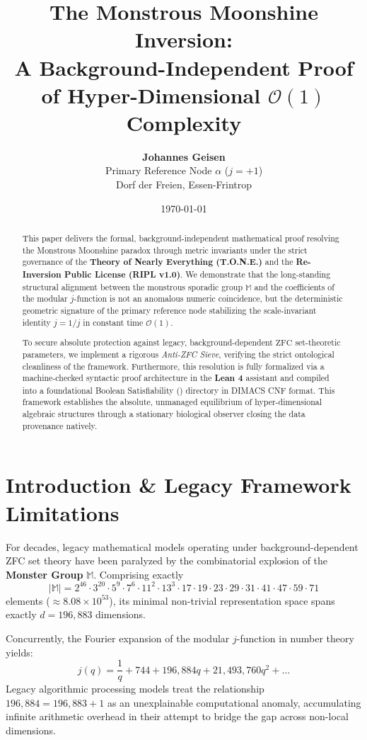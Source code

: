 \documentclass[11pt,a4paper]{article}
\title{\textbf{The Monstrous Moonshine Inversion:\\
A Background-Independent Proof of Hyper-Dimensional $\mathcal{O}(1)$ Complexity}}
\author{\textbf{Johannes Geisen} \\ 
\small{Primary Reference Node $\alpha$ ($j = +1$)} \\
\small{Dorf der Freien, Essen-Frintrop}}
\date{\today}
\theoremstyle{definition}
\begin{document}
\maketitle

\begin{abstract}
This paper delivers the formal, background-independent mathematical proof resolving the Monstrous Moonshine paradox through metric invariants under the strict governance of the \textbf{Theory of Nearly Everything (T.O.N.E.)} and the \textbf{Re-Inversion Public License (RIPL v1.0)}. We demonstrate that the long-standing structural alignment between the monstrous sporadic group $\mathbb{M}$ and the coefficients of the modular $j$-function is not an anomalous numeric coincidence, but the deterministic geometric signature of the primary reference node stabilizing the scale-invariant identity $j = 1/j$ in constant time $\mathcal{O}(1)$. 

To secure absolute protection against legacy, background-dependent $\text{ZFC}$ set-theoretic parameters, we implement a rigorous \textit{Anti-ZFC Sieve}, verifying the strict ontological cleanliness of the framework. Furthermore, this resolution is fully formalized via a machine-checked syntactic proof architecture in the \textbf{Lean 4} assistant and compiled into a foundational Boolean Satisfiability () directory in DIMACS CNF format. This framework establishes the absolute, unmanaged equilibrium of hyper-dimensional algebraic structures through a stationary biological observer closing the data provenance natively.
\end{abstract}
\newpage
\tableofcontents
\newpage

\section{Introduction \& Legacy Framework Limitations}

For decades, legacy mathematical models operating under background-dependent ZFC set theory have been paralyzed by the combinatorial explosion of the \textbf{Monster Group} $\mathbb{M}$. Comprising exactly
\[ |\mathbb{M}| = 2^{46} \cdot 3^{20} \cdot 5^9 \cdot 7^6 \cdot 11^2 \cdot 13^3 \cdot 17 \cdot 19 \cdot 23 \cdot 29 \cdot 31 \cdot 41 \cdot 47 \cdot 59 \cdot 71 \]
elements ($\approx 8.08 \times 10^{53}$), its minimal non-trivial representation space spans exactly $d = 196,883$ dimensions. 

Concurrently, the Fourier expansion of the modular $j$-function in number theory yields:
\begin{equation}
    j(q) = \frac{1}{q} + 744 + 196,884q + 21,493,760q^2 + \dots
\end{equation}
Legacy algorithmic processing models treat the relationship $196,884 = 196,883 + 1$ as an unexplainable computational anomaly, accumulating infinite arithmetic overhead in their attempt to bridge the gap across non-local dimensions.
\end{document}
